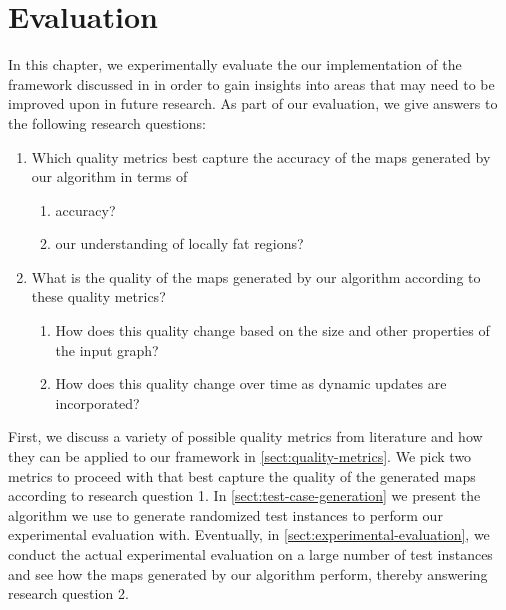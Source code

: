 \chapter{Evaluation}
\label{chap:evaluation}

In this chapter, we experimentally evaluate the our implementation of the framework discussed in  in order to gain insights into areas that may need to be improved upon in future research.
As part of our evaluation, we give answers to the following research questions:

\begin{enumerate}
	\item Which quality metrics best capture the accuracy of the maps generated by our algorithm in terms of
	\begin{enumerate}
	\item accuracy?
	\item our understanding of locally fat regions?
	\end{enumerate}
	\item What is the quality of the maps generated by our algorithm according to these quality metrics?
	\begin{enumerate}
	\item How does this quality change based on the size and other properties of the input graph?
	\item How does this quality change over time as dynamic updates are incorporated?
	\end{enumerate}
\end{enumerate}

First, we discuss a variety of possible quality metrics from literature and how they can be applied to our framework in \cref{sect:quality-metrics}.
We pick two metrics to proceed with that best capture the quality of the generated maps according to research question 1.
In \cref{sect:test-case-generation} we present the algorithm we use to generate randomized test instances to perform our experimental evaluation with.
Eventually, in \cref{sect:experimental-evaluation}, we conduct the actual experimental evaluation on a large number of test instances and see how the maps generated by our algorithm perform, thereby answering research question 2.


\clearpage

\clearpage

